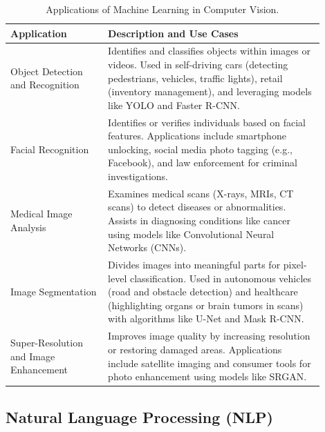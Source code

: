 \begin{table}[h]
\centering
\begin{tabular}{p{0.28\linewidth} p{0.62\linewidth}}
\toprule
\textbf{Application} & \textbf{Description and Use Cases} \\
\midrule
Object Detection and Recognition &
Identifies and classifies objects within images or videos. Used
in self-driving cars (detecting pedestrians, vehicles, traffic
lights), retail (inventory management), and leveraging models like YOLO and Faster R-CNN. \\
\midrule
Facial Recognition &
Identifies or verifies individuals based on facial features. Applications
include smartphone unlocking, social media photo
tagging (e.g., Facebook), and law enforcement for criminal
investigations. \\
\midrule
Medical Image Analysis &
Examines medical scans (X-rays, MRIs, CT scans) to detect
diseases or abnormalities. Assists in diagnosing conditions
like cancer using models like Convolutional Neural Networks
(CNNs). \\
\midrule
Image Segmentation &
Divides images into meaningful parts for pixel-level classification.
Used in autonomous vehicles (road and obstacle
detection) and healthcare (highlighting organs or brain tumors in scans) with algorithms like U-Net and Mask R-CNN. \\
\midrule
Super-Resolution and Image Enhancement &
Improves image quality by increasing resolution or restoring
damaged areas. Applications include satellite imaging and
consumer tools for photo enhancement using models like SRGAN. \\
\bottomrule
\end{tabular}
\caption{Applications of Machine Learning in Computer Vision.}
\label{tab:ch1-cv}
\end{table}

\subsection{Natural Language Processing (NLP)}
\label{sec:ch1-nlp}

